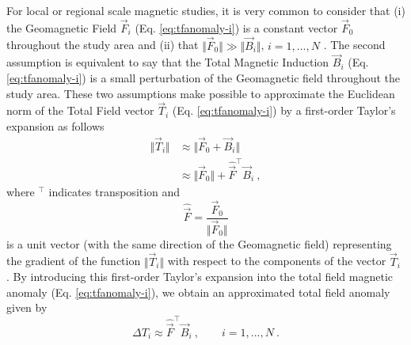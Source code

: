 \documentclass[journal abbreviation, npg]{copernicus}
\begin{document}
For local or regional scale magnetic studies, it is very common to consider that (i) the Geomagnetic Field $\vec{F}_i$ (Eq. \ref{eq:tfanomaly-i}) is a constant vector $\vec{F}_{0}$ throughout the study area and (ii) that $\Vert \vec{F}_{0} \Vert \gg \Vert \vec{B}_{i} \Vert$, $i = 1, ..., N$ \citep{telford-etal1990, blakely1996}. The second assumption is equivalent to say that the Total Magnetic Induction $\vec{B}_i$ (Eq. \ref{eq:tfanomaly-i}) is a small perturbation of the Geomagnetic field throughout the study area. These two assumptions make possible to approximate the Euclidean norm of the Total Field vector $\vec{T}_i$ (Eq. \ref{eq:tfanomaly-i}) by a first-order Taylor's expansion as follows
\begin{equation}
\begin{array}{cl}
\Vert \vec{T}_{i} \Vert & 
\approx \Vert \vec{F}_{0} + \vec{B}_{i} \Vert \\
\: &
\approx \Vert \vec{F}_{0} \Vert + \hat{\vec{F}}^{\intercal}\vec{B}_{i} \: ,
\end{array}
\label{eq:total-field-app}
\end{equation}
where $^{\intercal}$ indicates transposition and
\begin{equation}
\hat{\vec{F}} = \dfrac{\vec{F}_{0}}{\Vert \vec{F}_{0} \Vert}
\label{eq:unit-vector}
\end{equation}
is a unit vector (with the same direction of the Geomagnetic field) representing the gradient of the function $\Vert \vec{T}_{i} \Vert$ with respect to the components of the vector $\vec{T}_{i}$ \citep{blakely1996}. By introducing this first-order Taylor's expansion into the total field magnetic anomaly (Eq. \ref{eq:tfanomaly-i}), we obtain an approximated total field anomaly given by
\begin{equation}
\Delta T_{i} \approx \hat{\vec{F}}^{\intercal}\vec{B}_{i} \: , \qquad i = 1, ..., N \: .
\label{eq:approx-tfanomaly-i}
\end{equation}
\end{document}

